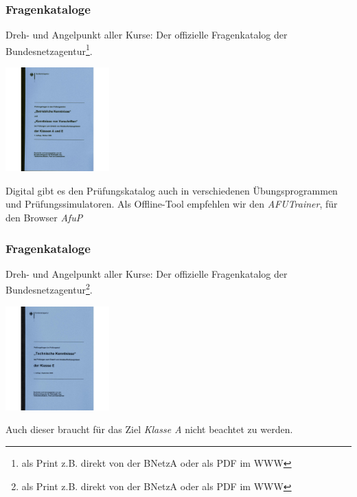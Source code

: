 \begin{frame}
    \frametitle{Fragenkataloge}

    Dreh- und Angelpunkt aller Kurse: Der offizielle Fragenkatalog der
    Bundesnetzagentur\footnote{als Print z.B. direkt von der BNetzA oder als PDF im WWW}.

    \begin{center}
        \includegraphics[width=0.3\textwidth]{e00/Fragenkatalog-Klasse-A-und-E-Betriebliche-Kenntnisse-und-Kenntnisse-von-Vorschriften.jpg}
        \tiny \hyperlink{refs}{\cite{darcv}}
    \end{center}

    Digital gibt es den Prüfungskatalog auch in verschiedenen Übungsprogrammen
    und Prüfungssimulatoren. Als Offline-Tool empfehlen wir den
    \emph{AFUTrainer}\hyperlink{refs}{\cite{afut}}, für den Browser
    \emph{AfuP}\hyperlink{refs}{\cite{afup}}

\end{frame}

\begin{frame}
    \frametitle{Fragenkataloge}

    Dreh- und Angelpunkt aller Kurse: Der offizielle Fragenkatalog der
    Bundesnetzagentur\footnote{als Print z.B. direkt von der BNetzA oder als PDF im WWW}.

    \begin{center}
        \includegraphics[width=0.3\textwidth]{e00/Fragenkatalog-Klasse-E-Technische-Kenntnisse.jpg}
        \tiny \hyperlink{refs}{\cite{darcv}}
    \end{center}

    Auch dieser braucht für das Ziel \emph{Klasse A} nicht beachtet zu werden.

\end{frame}

